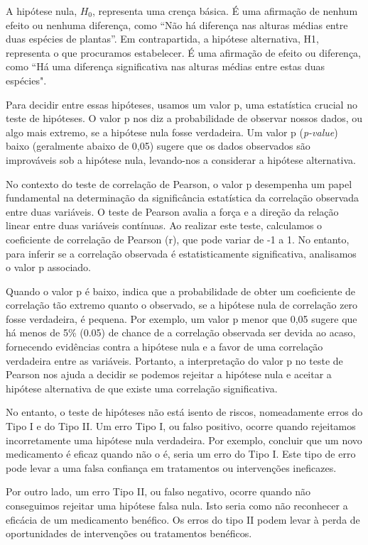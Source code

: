 \documentclass[article]{memoir}
\begin{document}
A hipótese nula, $H_0$, representa uma crença básica. É uma afirmação de nenhum efeito ou nenhuma diferença, como “Não há diferença nas alturas médias entre duas espécies de plantas”. Em contrapartida, a hipótese alternativa, H1, representa o que procuramos estabelecer. É uma afirmação de efeito ou diferença, como ``Há uma diferença significativa nas alturas médias entre estas duas espécies".

Para decidir entre essas hipóteses, usamos um valor p, uma estatística crucial no teste de hipóteses. O valor p nos diz a probabilidade de observar nossos dados, ou algo mais extremo, se a hipótese nula fosse verdadeira. Um valor p (\textit{p-value}) baixo (geralmente abaixo de 0,05) sugere que os dados observados são improváveis sob a hipótese nula, levando-nos a considerar a hipótese alternativa.

No contexto do teste de correlação de Pearson, o valor p desempenha um papel fundamental na determinação da significância estatística da correlação observada entre duas variáveis. O teste de Pearson avalia a força e a direção da relação linear entre duas variáveis contínuas. Ao realizar este teste, calculamos o coeficiente de correlação de Pearson (r), que pode variar de -1 a 1. No entanto, para inferir se a correlação observada é estatisticamente significativa, analisamos o valor p associado.

Quando o valor p é baixo, indica que a probabilidade de obter um coeficiente de correlação tão extremo quanto o observado, se a hipótese nula de correlação zero fosse verdadeira, é pequena. Por exemplo, um valor p menor que 0,05 sugere que há menos de 5\% (0.05) de chance de a correlação observada ser devida ao acaso, fornecendo evidências contra a hipótese nula e a favor de uma correlação verdadeira entre as variáveis. Portanto, a interpretação do valor p no teste de Pearson nos ajuda a decidir se podemos rejeitar a hipótese nula e aceitar a hipótese alternativa de que existe uma correlação significativa.

No entanto, o teste de hipóteses não está isento de riscos, nomeadamente erros do Tipo I e do Tipo II. Um erro Tipo I, ou falso positivo, ocorre quando rejeitamos incorretamente uma hipótese nula verdadeira. Por exemplo, concluir que um novo medicamento é eficaz quando não o é, seria um erro do Tipo I. Este tipo de erro pode levar a uma falsa confiança em tratamentos ou intervenções ineficazes.

Por outro lado, um erro Tipo II, ou falso negativo, ocorre quando não conseguimos rejeitar uma hipótese falsa nula. Isto seria como não reconhecer a eficácia de um medicamento benéfico. Os erros do tipo II podem levar à perda de oportunidades de intervenções ou tratamentos benéficos.
\end{document}
